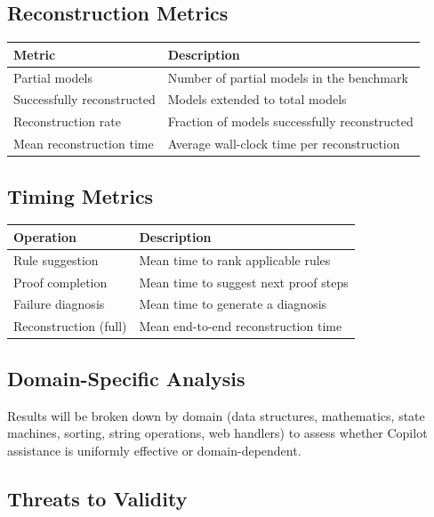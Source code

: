 \documentclass[11pt]{article}
\begin{document}
\subsection{Reconstruction Metrics}

\begin{center}
\begin{tabular}{lp{8cm}}
\toprule
\textbf{Metric} & \textbf{Description} \\
\midrule
Partial models             & Number of partial models in the benchmark \\
Successfully reconstructed & Models extended to total models \\
Reconstruction rate        & Fraction of models successfully reconstructed \\
Mean reconstruction time   & Average wall-clock time per reconstruction \\
\bottomrule
\end{tabular}
\end{center}

\subsection{Timing Metrics}

\begin{center}
\begin{tabular}{lp{8cm}}
\toprule
\textbf{Operation} & \textbf{Description} \\
\midrule
Rule suggestion       & Mean time to rank applicable rules \\
Proof completion      & Mean time to suggest next proof steps \\
Failure diagnosis     & Mean time to generate a diagnosis \\
Reconstruction (full) & Mean end-to-end reconstruction time \\
\bottomrule
\end{tabular}
\end{center}

\subsection{Domain-Specific Analysis}

Results will be broken down by domain (data structures, mathematics, state
machines, sorting, string operations, web handlers) to assess whether
Copilot assistance is uniformly effective or domain-dependent.

\subsection{Threats to Validity}
\end{document}
